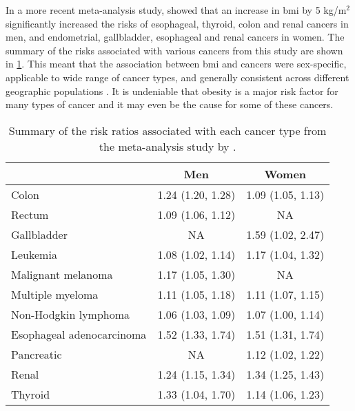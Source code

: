 In a more recent meta-analysis study, \citet{Renehan2008} showed that an increase in \gls{bmi} by 5 kg/m$^2$ significantly increased the risks of esophageal, thyroid, colon and renal cancers in men, and endometrial, gallbladder, esophageal and renal cancers in women.
The summary of the risks associated with various cancers from this study are shown in \cref{tab:renehan_cancer_risks}.
This meant that the association between \gls{bmi} and cancers were sex-specific, applicable to wide range of cancer types, and generally consistent across different geographic populations \citep{Renehan2008,Roberts2010}.
It is undeniable that obesity is a major risk factor for many types of cancer and it may even be the cause for some of these cancers.

\begin{table}[htb]
	\centering
	\begin{threeparttable}
		\caption[Summary of the risk ratios associated with each cancer type from the meta-analysis study by \citet{Renehan2008}]{Summary of the risk ratios associated with each cancer type from the meta-analysis study by \citet{Renehan2008}.}
		\label{tab:renehan_cancer_risks}
		\begin{tabular}{lcc}
													   & Men               & Women\\
			\hline
			\rule{0pt}{2.25ex}Colon                 & 1.24 (1.20, 1.28) & 1.09 (1.05, 1.13)\\
			Rectum                                  & 1.09 (1.06, 1.12) & NA\tnote{3}\\
			Gallbladder                             & NA                & 1.59 (1.02, 2.47)\\
			Leukemia                                & 1.08 (1.02, 1.14) & 1.17 (1.04, 1.32)\\
			Malignant melanoma                      & 1.17 (1.05, 1.30) & NA\\
			Multiple myeloma                        & 1.11 (1.05, 1.18) & 1.11 (1.07, 1.15)\\
			Non-Hodgkin lymphoma                    & 1.06 (1.03, 1.09) & 1.07 (1.00, 1.14)\\
			Esophageal adenocarcinoma               & 1.52 (1.33, 1.74) & 1.51 (1.31, 1.74)\\
			Pancreatic                              & NA                & 1.12 (1.02, 1.22)\\
			Renal                                   & 1.24 (1.15, 1.34) & 1.34 (1.25, 1.43)\\
			Thyroid                                 & 1.33 (1.04, 1.70) & 1.14 (1.06, 1.23)\\

\end{tabular}
\end{threeparttable}
\end{table}
